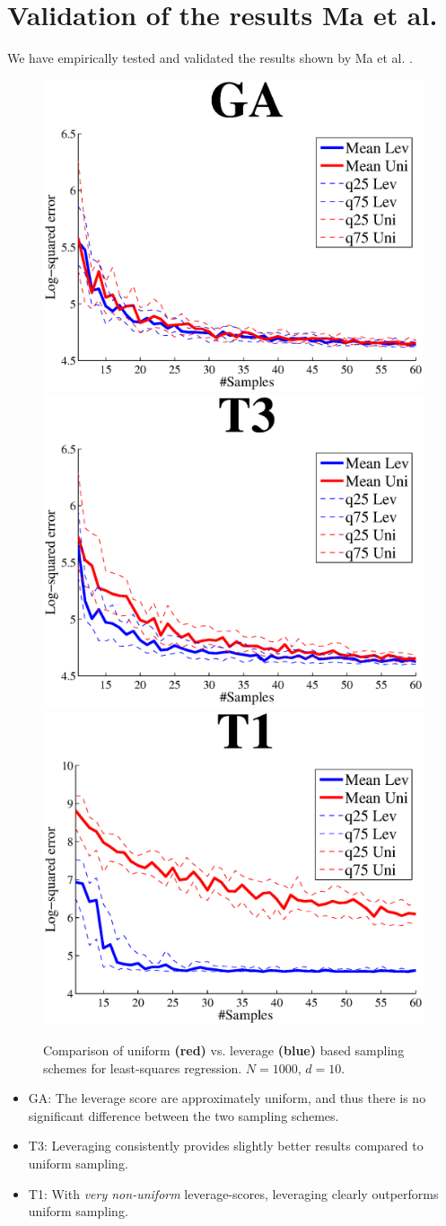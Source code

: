\section{Validation of the results  Ma et al.}
We have empirically tested and validated the results shown by Ma et al. \cite{Ma}.
\begin{figure}[H]
\centering
\includegraphics[width=.32\linewidth]{02460_poster_template/images/GALS.eps}
\includegraphics[width=.32\linewidth]{02460_poster_template/images/T3LS.eps}
\includegraphics[width=.32\linewidth]{02460_poster_template/images/T1LS.eps}
\caption{Comparison of uniform {\bf\color{red}(red)} vs. leverage {\bf\color{blue}(blue)} based sampling schemes for least-squares regression. $N = 1000$, $d = 10$.}
\end{figure}
\begin{minipage}{.55\linewidth}
\begin{itemize}
\item GA: The leverage score are approximately uniform, and thus there is no significant difference between the two sampling schemes.
\item T3: Leveraging consistently provides slightly better results compared to uniform sampling.
\item T1: With \emph{very non-uniform} leverage-scores, leveraging clearly outperforms uniform sampling.
\end{itemize}
\end{minipage}

